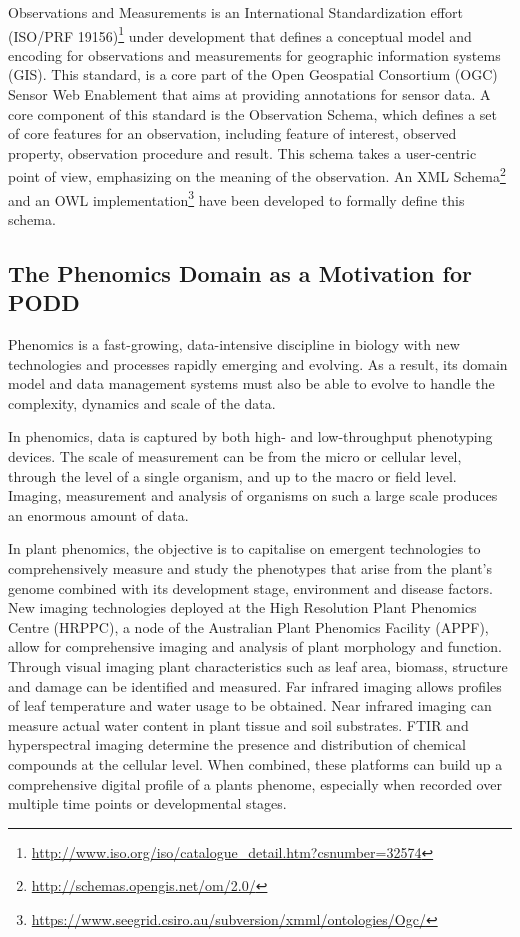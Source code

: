 \documentclass[preprint,12pt]{elsarticle}
\begin{document}
Observations and Measurements is an International Standardization effort (ISO/PRF 19156)\footnote{\url{http://www.iso.org/iso/catalogue_detail.htm?csnumber=32574}} under development that defines a conceptual model and encoding for observations and measurements for geographic information systems (GIS). This standard, is a core part of the Open Geospatial Consortium (OGC) Sensor Web Enablement that aims at providing annotations for sensor data. A core component of this standard is the Observation Schema, which defines a set of core features for an observation, including feature of interest, observed property, observation procedure and result. This schema takes a user-centric point of view, emphasizing on the meaning of the observation. An XML Schema\footnote{\url{http://schemas.opengis.net/om/2.0/}} and an OWL implementation\footnote{\url{https://www.seegrid.csiro.au/subversion/xmml/ontologies/Ogc/}} have been developed to formally define this schema.

\subsection{The Phenomics Domain as a Motivation for PODD}
Phenomics is a fast-growing, data-intensive discipline in biology with new technologies and processes rapidly emerging and evolving. As a result, its domain model and data management systems must also be able to evolve to handle the complexity, dynamics and scale of the data. 

In phenomics, data is captured by both high- and low-throughput phenotyping devices. The scale of measurement can be from the micro or cellular level, through the level of a single organism, and up to the macro or field level. Imaging, measurement and analysis of organisms on such a large scale produces an enormous amount of data.

In plant phenomics, the objective is to capitalise on emergent technologies to comprehensively measure and study the phenotypes that arise from the plant's genome combined with its development stage, environment and disease factors. New imaging technologies deployed at the High Resolution Plant Phenomics Centre (HRPPC), a node of the Australian Plant Phenomics Facility (APPF), allow for comprehensive imaging and analysis of plant morphology and function. Through visual imaging plant characteristics such as leaf area, biomass, structure and damage can be identified and measured. Far infrared imaging allows profiles of leaf temperature and water usage to be obtained. Near infrared imaging can measure actual water content in plant tissue and soil substrates. FTIR and hyperspectral imaging determine the presence and distribution of chemical compounds at the cellular level. When combined, these platforms can build up a comprehensive digital profile of a plants phenome, especially when recorded over multiple time points or developmental stages. 
\end{document}
